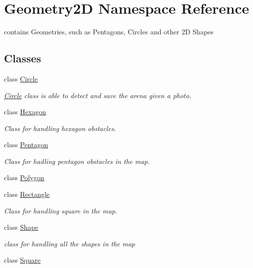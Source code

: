 \hypertarget{namespace_geometry2_d}{}\section{Geometry2D Namespace Reference}
\label{namespace_geometry2_d}


contains Geometries, such as Pentagons, Circles and other 2D Shapes  


\subsection*{Classes}
\begin{DoxyCompactItemize}
\item 
class \mbox{\hyperlink{class_geometry2_d_1_1_circle}{Circle}}
\begin{DoxyCompactList}\small\item\em \mbox{\hyperlink{class_geometry2_d_1_1_circle}{Circle}} class is able to detect and save the arena given a photo. \end{DoxyCompactList}\item 
class \mbox{\hyperlink{class_geometry2_d_1_1_hexagon}{Hexagon}}
\begin{DoxyCompactList}\small\item\em Class for handling hexagon obstacles. \end{DoxyCompactList}\item 
class \mbox{\hyperlink{class_geometry2_d_1_1_pentagon}{Pentagon}}
\begin{DoxyCompactList}\small\item\em Class for hadling pentagon obstacles in the map. \end{DoxyCompactList}\item 
class \mbox{\hyperlink{class_geometry2_d_1_1_polygon}{Polygon}}
\item 
class \mbox{\hyperlink{class_geometry2_d_1_1_rectangle}{Rectangle}}
\begin{DoxyCompactList}\small\item\em Class for handling square in the map. \end{DoxyCompactList}\item 
class \mbox{\hyperlink{class_geometry2_d_1_1_shape}{Shape}}
\begin{DoxyCompactList}\small\item\em class for handling all the shapes in the map \end{DoxyCompactList}\item 
class \mbox{\hyperlink{class_geometry2_d_1_1_square}{Square}}

\end{DoxyCompactItemize}
